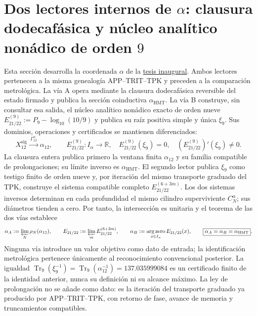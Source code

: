 
\section{Dos lectores internos de \texorpdfstring{\(\alpha\)}{alpha}: clausura dodecafásica y núcleo analítico nonádico de orden \texorpdfstring{\(9\)}{9}}
\label{sec:l9s102:alpha-dos-vias}

Esta sección desarrolla la coordenada \(\alpha\) de la
\hyperref[sec:tesis-inaugural-helicoidal-hmt-md]{tesis inaugural}. Ambos
lectores pertenecen a la misma genealogía APP--TRIT--TPK y preceden a la
comparación metrológica. La vía A opera mediante la clausura dodecafásica
reversible del estado firmado y publica la sección coinductiva
\(\alpha_{\mathrm{HMT}}\). La vía B construye, sin consultar esa salida, el
núcleo analítico nonádico exacto de orden nueve
\(E_{21/22}^{(9)}:=P_9-\log_{10}(10/9)\) y publica su raíz positiva simple y
única \(\xi_9\). Sus dominios, operaciones y certificados se mantienen
diferenciados:
\begin{equation}
 X_{12}^{\mathrm{sig}}
 \xrightarrow{\ \Gamma_{12}^{\alpha}\ }
 \alpha_{12},
 \qquad
 E_{21/22}^{(9)}:I_\alpha\longrightarrow\mathbb R,
 \quad E_{21/22}^{(9)}(\xi_9)=0,
 \quad (E_{21/22}^{(9)})'(\xi_9)\ne0.
 \label{eq:l9s102:alpha-dos-mapas}
\end{equation}
La clausura entera publica primero la ventana finita \(\alpha_{12}\) y su
familia compatible de prolongaciones; su límite inverso es
\(\alpha_{\mathrm{HMT}}\). El segundo lector publica \(\xi_9\) como testigo
finito de orden nueve y, por iteración del mismo transporte graduado del TPK,
construye el sistema compatible completo
\(E_{21/22}^{(6+3m)}\). Los dos sistemas inversos determinan en cada
profundidad el mismo cilindro superviviente \(C_N^\alpha\); sus diámetros
tienden a cero. Por tanto, la intersección es unitaria y el teorema de las
dos vías establece
\begin{equation}
 \alpha_A:=\varprojlim_N\rho_N(\alpha_{12}),
 \qquad
 E_{21/22}:=\varprojlim_m E_{21/22}^{(6+3m)},
 \qquad
 \alpha_B:=\operatorname*{arg\,zero}_{x\in I_\alpha}E_{21/22}(x),
 \qquad
 \boxed{\alpha_A=\alpha_B=\alpha_{\mathrm{HMT}}}.
 \label{eq:l9s102:alpha-identidad-limite-dos-vias}
\end{equation}
Ninguna vía introduce un valor objetivo como dato de entrada; la
identificación metrológica pertenece únicamente al reconocimiento
convencional posterior. La igualdad
\(\operatorname{Tr}_9(\xi_9^{-1})=
\operatorname{Tr}_9(\alpha_{12}^{-1})=137.035999084\) es un certificado
finito de la identidad anterior, nunca su definición ni su alcance máximo.
La ley de prolongación no se añade como dato: es la iteración del transporte
graduado ya producido por APP--TRIT--TPK, con retorno de fase, avance de
memoria y truncamientos compatibles.

